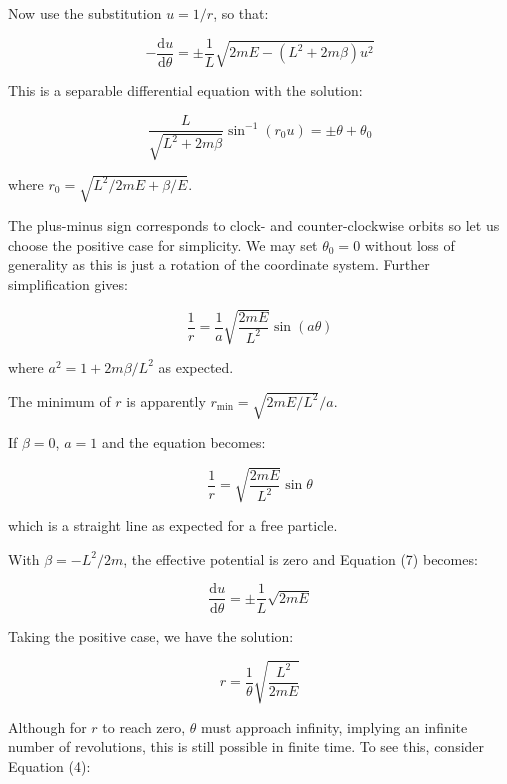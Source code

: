 \documentclass[12pt]{article}
\begin{document}
Now use the substitution $u = 1/r$, so that:

\begin{equation}
    -\frac{\mathrm{d}u}{\mathrm{d}\theta} = \pm\frac{1}{L} \sqrt{2mE - (L^{2} + 2m\beta)u^{2}}
\end{equation}

This is a separable differential equation with the solution:

\begin{equation}
    \frac{L}{\sqrt{L^{2} + 2m\beta}} \sin^{-1}{\left( r_{0}u \right)} = \pm\theta + \theta_{0}
\end{equation}

where $r_{0} = \sqrt{L^{2}/2mE + \beta/E}$.

The plus-minus sign corresponds to clock- and counter-clockwise orbits so let us choose the positive case for simplicity. We may set $\theta_{0} = 0$ without loss of generality as this is just a rotation of the coordinate system. Further simplification gives:

\begin{equation}
    \frac{1}{r} = \frac{1}{a} \sqrt{\frac{2mE}{L^{2}}} \sin{(a\theta)}
\end{equation}

where $a^{2} = 1 + 2m\beta/L^{2}$ as expected.

The minimum of $r$ is apparently $r_{\text{min}} = \sqrt{2mE/L^{2}}/a$.

If $\beta = 0$, $a = 1$ and the equation becomes:

\begin{equation}
    \frac{1}{r} = \sqrt{\frac{2mE}{L^{2}}} \sin{\theta}
\end{equation}

which is a straight line as expected for a free particle.

With $\beta = -L^{2}/2m$, the effective potential is zero and Equation (7) becomes:

\begin{equation}
    \frac{\mathrm{d}u}{\mathrm{d}\theta} = \pm\frac{1}{L} \sqrt{2mE}
\end{equation}

Taking the positive case, we have the solution:

\begin{equation}
    r = \frac{1}{\theta} \sqrt{\frac{L^{2}}{2mE}}
\end{equation}

Although for $r$ to reach zero, $\theta$ must approach infinity, implying an infinite number of revolutions, this is still possible in finite time. To see this, consider Equation (4):
\end{document}
